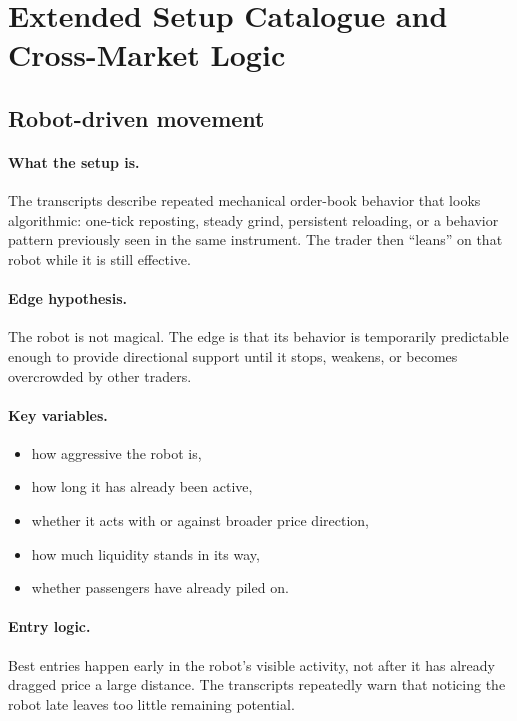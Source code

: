 \section{Extended Setup Catalogue and Cross-Market Logic}

\subsection{Robot-driven movement}

\paragraph{What the setup is.} The transcripts describe repeated mechanical order-book behavior that looks algorithmic: one-tick reposting, steady grind, persistent reloading, or a behavior pattern previously seen in the same instrument. The trader then ``leans'' on that robot while it is still effective.

\paragraph{Edge hypothesis.} The robot is not magical. The edge is that its behavior is temporarily predictable enough to provide directional support until it stops, weakens, or becomes overcrowded by other traders.

\paragraph{Key variables.}
\begin{itemize}
\item how aggressive the robot is,
\item how long it has already been active,
\item whether it acts with or against broader price direction,
\item how much liquidity stands in its way,
\item whether passengers have already piled on.
\end{itemize}

\paragraph{Entry logic.} Best entries happen early in the robot's visible activity, not after it has already dragged price a large distance. The transcripts repeatedly warn that noticing the robot late leaves too little remaining potential.

